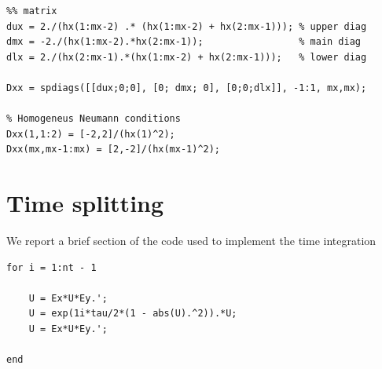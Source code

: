 \begin{lstlisting}
%% matrix
dux = 2./(hx(1:mx-2) .* (hx(1:mx-2) + hx(2:mx-1))); % upper diag 
dmx = -2./(hx(1:mx-2).*hx(2:mx-1));                 % main diag
dlx = 2./(hx(2:mx-1).*(hx(1:mx-2) + hx(2:mx-1)));   % lower diag

Dxx = spdiags([[dux;0;0], [0; dmx; 0], [0;0;dlx]], -1:1, mx,mx);

% Homogeneus Neumann conditions 
Dxx(1,1:2) = [-2,2]/(hx(1)^2);
Dxx(mx,mx-1:mx) = [2,-2]/(hx(mx-1)^2);
\end{lstlisting}

\section*{Time splitting}

We report a brief section of the code used to implement the time integration

\begin{lstlisting}
for i = 1:nt - 1

    U = Ex*U*Ey.';
    U = exp(1i*tau/2*(1 - abs(U).^2)).*U;
    U = Ex*U*Ey.';
 
end
\end{lstlisting}